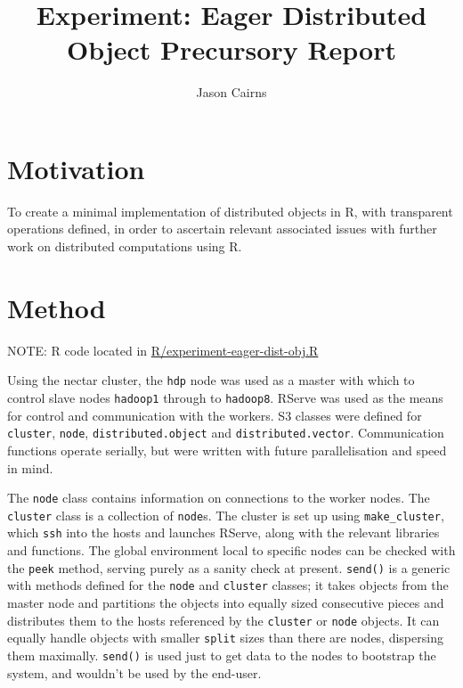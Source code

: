 \documentclass[a4paper,10pt]{article}
\begin{document}
\title{Experiment: Eager Distributed Object Precursory Report}
\author{Jason Cairns}
  
\maketitle

\section{Motivation}

To create a minimal implementation of distributed objects in R, with
transparent operations defined, in order to ascertain relevant associated
issues with further work on distributed computations using R.

\section{Method}

NOTE: R code located in
\href{R/experiment-eager-dist-obj.R}{R/experiment-eager-dist-obj.R}

Using the nectar cluster, the \texttt{hdp} node was used as a master with which
to control slave nodes \texttt{hadoop1} through to \texttt{hadoop8}.
RServe was used as the means for control and communication with the workers.
S3 classes were defined for \texttt{cluster}, \texttt{node},
\texttt{distributed.object} and \texttt{distributed.vector}. 
Communication functions operate serially, but were written with future
parallelisation and speed in mind.

The \texttt{node} class contains information on connections to the worker nodes.
The \texttt{cluster} class is a collection of \texttt{node}s.
The cluster is set up using \texttt{make\_cluster}, which \texttt{ssh} into the
hosts and launches RServe, along with the relevant libraries and functions.
The global environment local to specific nodes can be checked with the
\texttt{peek} method, serving purely as a sanity check at present.
\texttt{send()} is a generic with methods defined for the \texttt{node} and
\texttt{cluster} classes;
it takes objects from the master node and partitions the objects into equally
sized consecutive pieces and distributes them to the hosts referenced by the
\texttt{cluster} or \texttt{node} objects.
It can equally handle objects with smaller \texttt{split} sizes than there are
nodes, dispersing them maximally.
\texttt{send()} is used just to get data to the nodes to bootstrap the system,
and wouldn't be used by the end-user.
\end{document}
